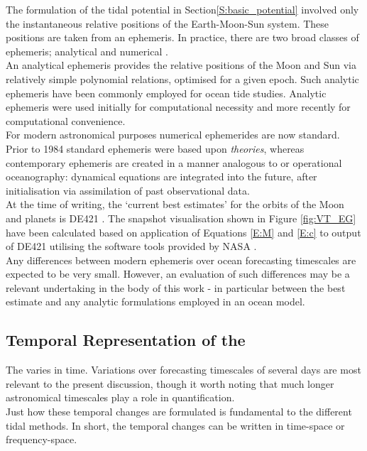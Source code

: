 The formulation of the tidal potential in Section\ref{S:basic_potential} involved only the instantaneous relative positions of the Earth-Moon-Sun system.   These positions are taken from an ephemeris.  In practice, there are two broad classes of ephemeris; analytical and numerical \citep{Wenzel:1997kn}.\\
An analytical ephemeris provides the relative positions of the Moon and Sun via relatively simple polynomial relations, optimised for a given epoch.  Such analytic ephemeris have been commonly employed for ocean tide studies.   Analytic ephemeris were used initially for computational necessity and more recently for computational convenience.\\
For modern astronomical purposes numerical ephemerides are now standard.  Prior to 1984 standard ephemeris were based upon \emph{theories}\cite[sec 8.1]{Urban:2013vl}, whereas contemporary ephemeris are created in a manner analogous to \NWP{} or operational oceanography: dynamical equations are integrated into the future, after initialisation via assimilation of past observational data.\\
At the time of writing, the `current best estimates' for the orbits of the Moon and planets is DE421 \citep{Folkner:2008wm}.   The snapshot visualisation shown in Figure \ref{fig:VT_EG} have been calculated based on application of Equations \ref{E:M} and \ref{E:c} to output of DE421 utilising the software tools provided by NASA \cite[p]{Anonymous:vo}.\\
Any differences between modern ephemeris over ocean forecasting timescales are expected to be very small.   However, an evaluation of such differences may be a relevant undertaking in the body of this work - in particular between the best estimate and any analytic formulations employed in an ocean model.



\subsection{Temporal Representation of the \ATGP{}}
The \ATGP{} varies in time.  Variations over forecasting timescales of several days are most relevant to the present discussion, though it worth noting that much longer astronomical timescales play a role in quantification.\\
Just how these temporal changes are formulated is fundamental to the different tidal methods.   In short, the temporal changes can be written in time-space or frequency-space.\\



